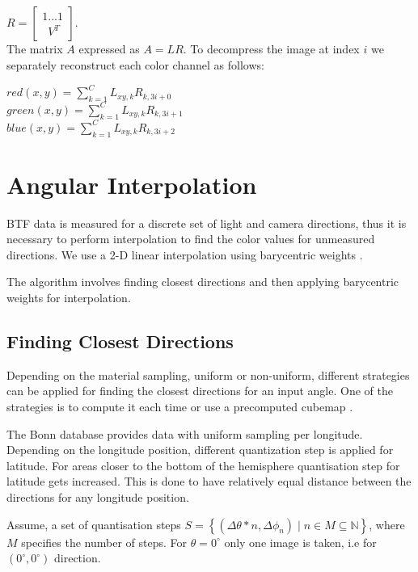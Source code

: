 {\centering $
R=\begin{bmatrix}
 1 ... 1   \\ 
  \, \, \, V^{T}
\end{bmatrix}.$ \\}
  The matrix $A$ expressed as $A=LR$. To decompress the image at index $i$ we separately reconstruct each color channel as follows: 


{\centering $red(x,y)=\sum_{k=1}^{C}L_{xy,k}R_{k,3i+0}$ \\}
{\centering $green(x,y)=\sum_{k=1}^{C}L_{xy,k}R_{k,3i+1}$ \\}
{\centering $blue(x,y)=\sum_{k=1}^{C}L_{xy,k}R_{k,3i+2}$ \\}


\section{Angular Interpolation}
\label{chapter:interpolation}


BTF data is measured for a discrete set of light and camera directions, thus it is necessary to perform interpolation to find the color values for unmeasured directions.
We use a 2-D linear interpolation using barycentric weights \cite{haindl_visual}. 

The algorithm involves finding closest directions and then applying barycentric weights for interpolation.

\subsection{Finding Closest Directions}
\label{chapter:finding_triangle}
Depending on the material sampling, uniform or non-uniform, different strategies can be applied for finding the closest directions for an input angle.
One of the strategies is to compute it  each time or use a precomputed cubemap \cite{haindl}.

The Bonn database \cite{btfBonn} provides data with uniform sampling per longitude. Depending on the longitude position, different quantization step is applied for latitude.
For areas closer to the bottom of the hemisphere quantisation step for latitude gets increased.
This is done to have relatively equal distance between the directions for any longitude position.


 Assume, a set of quantisation steps $S=\left \{ (\Delta \theta*n , \Delta \phi_n ) \mid n \in M \subseteq \mathbb{N} \right \}$, where $M$ specifies the number of steps.
For $\theta=0^{\circ}$ only one image is taken, i.e for $(0^{\circ},0^{\circ})$ direction.
  
